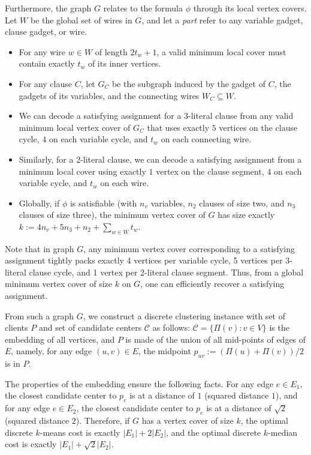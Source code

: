 \documentclass[11pt]{article}
\newcommand{\calC}{\mathcal {C}}
\begin{document}
Furthermore, the graph $G$ relates to the formula $\phi$ through its local vertex covers. Let $W$ be the global set of wires in $G$, and let a \emph{part} refer to any variable gadget, clause gadget, or wire.
\begin{itemize}
    \item For any wire $w \in W$ of length $2t_w + 1$, a valid minimum local cover must contain exactly $t_w$ of its inner vertices. 
    \item For any clause $C$, let $G_C$ be the subgraph induced by the gadget of $C$, the gadgets of its variables, and the connecting wires $W_C \subseteq W$. 
    \item We can decode a satisfying assignment for a 3-literal clause from any valid minimum local vertex cover of $G_C$ that uses exactly $5$ vertices on the clause cycle, $4$ on each variable cycle, and $t_w$ on each connecting wire. 
    \item Similarly, for a 2-literal clause, we can decode a satisfying assignment from a minimum local cover using exactly $1$ vertex on the clause segment, $4$ on each variable cycle, and $t_w$ on each wire. 
    \item Globally, if $\phi$ is satisfiable (with $n_v$ variables, $n_2$ clauses of size two, and $n_3$ clauses of size three), the minimum vertex cover of $G$ has size exactly $k :=  4n_v + 5n_3 + n_2 + \sum_{w \in W} t_w$. 
\end{itemize}
Note that in graph $G$, any minimum vertex cover corresponding to a satisfying assignment tightly packs exactly 4 vertices per variable cycle, 5 vertices per 3-literal clause cycle, and 1 vertex per 2-literal clause segment. Thus, from a global minimum vertex cover of size $k$ on $G$, one can efficiently recover a satisfying assignment.


From such a graph $G$, we construct a discrete clustering instance with set of clients $P$ and set of candidate centers $\calC$ as follows: $\calC = \{\Pi(v): v \in V\}$ is the embedding of all vertices, and 
$P$ is made of the union of all mid-points of edges of $E$, namely, for any edge $(u,v) \in E$, the midpoint $p_{uv} := (\Pi(u) + \Pi(v))/2$ is in $P$. 

The properties of the embedding ensure the following facts. 
For any edge $e \in E_1$, the closest candidate center to $p_e$ is at a distance of $1$ (squared distance $1$), and for any edge $e \in E_2$, the closest candidate center to $p_e$ is at a distance of $\sqrt{2}$ (squared distance $2$). Therefore, if $G$ has a vertex cover of size $k$, the optimal discrete $k$-means cost is exactly $|E_1| + 2|E_2|$, and the optimal discrete $k$-median cost is exactly $|E_1| + \sqrt{2}|E_2|$.
\end{document}
